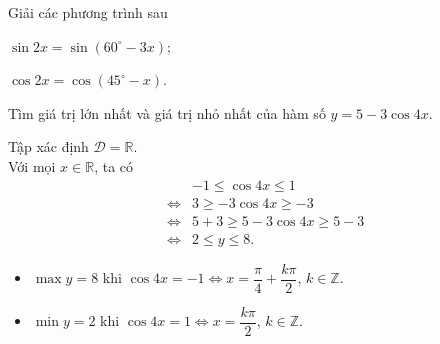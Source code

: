 \begin{bt}%
	Giải các phương trình sau
	\begin{listEX}[2]
		\item $\sin 2x  = \sin (60^{\circ} - 3x)$;
		\item $\cos 2 x=\cos \left(45^{\circ}-x\right)$.
	\end{listEX}
	
\end{bt}

\begin{vd}%
	[Mức độ 2]
	Tìm giá trị lớn nhất và giá trị nhỏ nhất của hàm số $ y=5-3 \cos 4 x $.
	\loigiai
	{
		Tập xác định $ \mathscr{D}=\mathbb{R}$.\\
		Với mọi $x \in \mathbb{R} $, ta có
		\begin{eqnarray*}
			&&-1 \leq \cos 4 x \leq 1 \\
			&\Leftrightarrow& 3 \geq-3 \cos 4 x \geq-3\\
			&\Leftrightarrow& 5+3 \geq 5-3 \cos 4 x \geq 5-3 \\
			&\Leftrightarrow& 2 \leq y \leq 8. 
		\end{eqnarray*}
	\begin{itemize}
		\item $ \max y=8 $ khi $ \cos 4 x=-1 \Leftrightarrow x=\dfrac{\pi}{4}+\dfrac{k\pi}{2}$, $k\in\mathbb{Z}$.
		\item $ \min y=2 $ khi $ \cos 4 x=1 \Leftrightarrow x=\dfrac{k\pi}{2}$, $k\in\mathbb{Z}$.
	\end{itemize}
	}
\end{vd}


